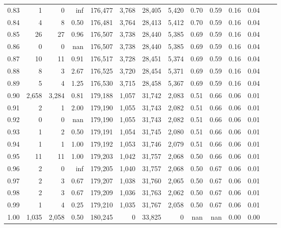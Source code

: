 \begin{tabular}{rrrrrrrrrrrrrr}
0.83 &       1 &      0 &     inf &  176,477 &    3,768 &  28,405 &   5,420 &  0.70 &  0.59 &  0.16 &      0.04 \\
0.84 &       4 &      8 &    0.50 &  176,481 &    3,764 &  28,413 &   5,412 &  0.70 &  0.59 &  0.16 &      0.04 \\
0.85 &      26 &     27 &    0.96 &  176,507 &    3,738 &  28,440 &   5,385 &  0.69 &  0.59 &  0.16 &      0.04 \\
0.86 &       0 &      0 &     nan &  176,507 &    3,738 &  28,440 &   5,385 &  0.69 &  0.59 &  0.16 &      0.04 \\
0.87 &      10 &     11 &    0.91 &  176,517 &    3,728 &  28,451 &   5,374 &  0.69 &  0.59 &  0.16 &      0.04 \\
0.88 &       8 &      3 &    2.67 &  176,525 &    3,720 &  28,454 &   5,371 &  0.69 &  0.59 &  0.16 &      0.04 \\
0.89 &       5 &      4 &    1.25 &  176,530 &    3,715 &  28,458 &   5,367 &  0.69 &  0.59 &  0.16 &      0.04 \\
0.90 &   2,658 &  3,284 &    0.81 &  179,188 &    1,057 &  31,742 &   2,083 &  0.51 &  0.66 &  0.06 &      0.01 \\
0.91 &       2 &      1 &    2.00 &  179,190 &    1,055 &  31,743 &   2,082 &  0.51 &  0.66 &  0.06 &      0.01 \\
0.92 &       0 &      0 &     nan &  179,190 &    1,055 &  31,743 &   2,082 &  0.51 &  0.66 &  0.06 &      0.01 \\
0.93 &       1 &      2 &    0.50 &  179,191 &    1,054 &  31,745 &   2,080 &  0.51 &  0.66 &  0.06 &      0.01 \\
0.94 &       1 &      1 &    1.00 &  179,192 &    1,053 &  31,746 &   2,079 &  0.51 &  0.66 &  0.06 &      0.01 \\
0.95 &      11 &     11 &    1.00 &  179,203 &    1,042 &  31,757 &   2,068 &  0.50 &  0.66 &  0.06 &      0.01 \\
0.96 &       2 &      0 &     inf &  179,205 &    1,040 &  31,757 &   2,068 &  0.50 &  0.67 &  0.06 &      0.01 \\
0.97 &       2 &      3 &    0.67 &  179,207 &    1,038 &  31,760 &   2,065 &  0.50 &  0.67 &  0.06 &      0.01 \\
0.98 &       2 &      3 &    0.67 &  179,209 &    1,036 &  31,763 &   2,062 &  0.50 &  0.67 &  0.06 &      0.01 \\
0.99 &       1 &      4 &    0.25 &  179,210 &    1,035 &  31,767 &   2,058 &  0.50 &  0.67 &  0.06 &      0.01 \\
1.00 &   1,035 &  2,058 &    0.50 &  180,245 &        0 &  33,825 &       0 &   nan &   nan &  0.00 &      0.00 \\
\bottomrule
\end{tabular}
